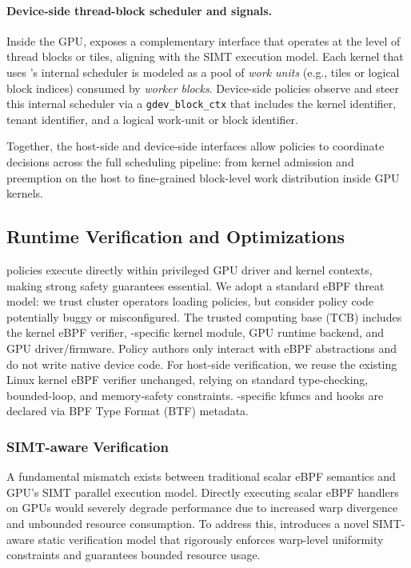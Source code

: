 \paragraph{Device-side thread-block scheduler and signals.}

Inside the GPU, \sys exposes a complementary interface that operates at the level of
thread blocks or tiles, aligning with the SIMT execution model. Each kernel that uses \sys's internal scheduler is modeled as a pool of \emph{work units} (e.g., tiles or logical block indices) consumed by \emph{worker blocks}. Device-side policies observe and steer this internal scheduler via a \texttt{gdev\_block\_ctx} that includes the kernel identifier, tenant identifier, and a logical work-unit or block identifier.

Together, the host-side and device-side interfaces allow \sys policies to coordinate decisions across the full scheduling pipeline: from kernel admission and preemption on the host to fine-grained block-level work distribution inside GPU kernels.


\subsection{Runtime Verification and Optimizations}
\label{sec:verification}

\sys policies execute directly within privileged GPU driver and kernel contexts, making strong safety guarantees essential. We adopt a standard eBPF threat model: we trust cluster operators loading policies, but consider policy code potentially buggy or misconfigured. The trusted computing base (TCB) includes the kernel eBPF verifier, \sys-specific kernel module, GPU runtime backend, and GPU driver/firmware. Policy authors only interact with eBPF abstractions and do not write native device code. For host-side verification, we reuse the existing Linux kernel eBPF verifier unchanged, relying on standard type-checking, bounded-loop, and memory-safety constraints. \sys-specific kfuncs and hooks are declared via BPF Type Format (BTF) metadata.

\subsubsection{SIMT-aware Verification}

A fundamental mismatch exists between traditional scalar eBPF semantics and GPU's SIMT parallel execution model. Directly executing scalar eBPF handlers on GPUs would severely degrade performance due to increased warp divergence and unbounded resource consumption. To address this, \sys introduces a novel SIMT-aware static verification model that rigorously enforces warp-level uniformity constraints and guarantees bounded resource usage.

